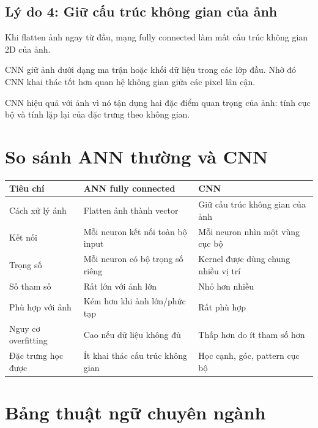 \documentclass[12pt,a4paper]{report}
\begin{document}
\section{Lý do 4: Giữ cấu trúc không gian của ảnh}

Khi flatten ảnh ngay từ đầu, mạng fully connected làm mất cấu trúc không gian 2D của ảnh.

CNN giữ ảnh dưới dạng ma trận hoặc khối dữ liệu trong các lớp đầu. Nhờ đó CNN khai thác tốt hơn quan hệ không gian giữa các pixel lân cận.

\begin{ghinho}
CNN hiệu quả với ảnh vì nó tận dụng hai đặc điểm quan trọng của ảnh: tính cục bộ và tính lặp lại của đặc trưng theo không gian.
\end{ghinho}

\chapter{So sánh ANN thường và CNN}

\begin{center}
\begin{tabular}{p{}p{}p{}}
\toprule
Tiêu chí & ANN fully connected & CNN \\
\midrule
Cách xử lý ảnh & Flatten ảnh thành vector & Giữ cấu trúc không gian của ảnh \\
Kết nối & Mỗi neuron kết nối toàn bộ input & Mỗi neuron nhìn một vùng cục bộ \\
Trọng số & Mỗi neuron có bộ trọng số riêng & Kernel được dùng chung nhiều vị trí \\
Số tham số & Rất lớn với ảnh lớn & Nhỏ hơn nhiều \\
Phù hợp với ảnh & Kém hơn khi ảnh lớn/phức tạp & Rất phù hợp \\
Nguy cơ overfitting & Cao nếu dữ liệu không đủ & Thấp hơn do ít tham số hơn \\
Đặc trưng học được & Ít khai thác cấu trúc không gian & Học cạnh, góc, pattern cục bộ \\
\bottomrule
\end{tabular}
\end{center}

\chapter{Bảng thuật ngữ chuyên ngành}
\end{document}
